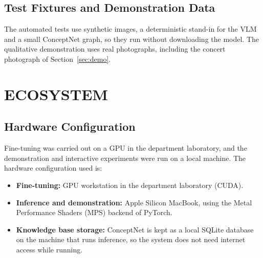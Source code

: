 \subsection{Test Fixtures and Demonstration Data}
The automated tests use synthetic images, a deterministic stand-in for the VLM and a small ConceptNet graph, so they run without downloading the model. The qualitative demonstration uses real photographs, including the concert photograph of Section~\ref{sec:demo}.

\section{ECOSYSTEM}
\subsection{Hardware Configuration}
Fine-tuning was carried out on a GPU in the department laboratory, and the demonstration and interactive experiments were run on a local machine. The hardware configuration used is:
\begin{itemize}
    \item \textbf{Fine-tuning:} GPU workstation in the department laboratory (CUDA).
    \item \textbf{Inference and demonstration:} Apple Silicon MacBook, using the Metal Performance Shaders (MPS) backend of PyTorch.
    \item \textbf{Knowledge base storage:} ConceptNet is kept as a local SQLite database on the machine that runs inference, so the system does not need internet access while running.
\end{itemize}

